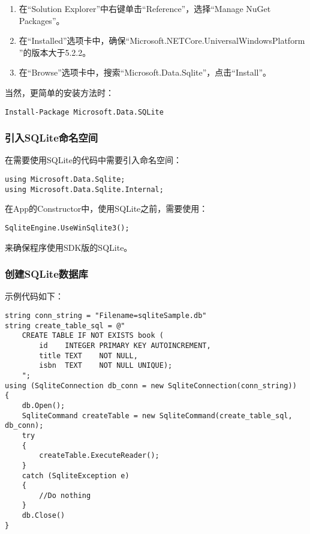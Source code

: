\begin{enumerate}
	\item 在“Solution Explorer”中右键单击“Reference”，选择“Manage NuGet Packages”。
	\item 在“Installed”选项卡中，确保“Microsoft.NETCore.UniversalWindowsPlatform ”的版本大于5.2.2。
	\item 在“Browse”选项卡中，搜索“Microsoft.Data.Sqlite”，点击“Install”。
\end{enumerate}

当然，更简单的安装方法时：
\begin{verbatim}
Install-Package Microsoft.Data.SQLite
\end{verbatim}

\subsubsection{引入SQLite命名空间}

在需要使用SQLite的\csharp 代码中需要引入命名空间：
\begin{verbatim}
using Microsoft.Data.Sqlite;
using Microsoft.Data.Sqlite.Internal;
\end{verbatim}

在App的Constructor中，使用SQLite之前，需要使用：
\begin{verbatim}
SqliteEngine.UseWinSqlite3();
\end{verbatim}
来确保程序使用SDK版的SQLite。

\subsubsection{创建SQLite数据库}

示例代码如下：

\begin{verbatim}
string conn_string = "Filename=sqliteSample.db"
string create_table_sql = @"
    CREATE TABLE IF NOT EXISTS book (
        id    INTEGER PRIMARY KEY AUTOINCREMENT,
        title TEXT    NOT NULL,
        isbn  TEXT    NOT NULL UNIQUE);
    ";
using (SqliteConnection db_conn = new SqliteConnection(conn_string))
{
    db.Open();
    SqliteCommand createTable = new SqliteCommand(create_table_sql, db_conn);
    try
    {
        createTable.ExecuteReader();
    }
    catch (SqliteException e)
    {
        //Do nothing
    }
    db.Close()
}
\end{verbatim}

